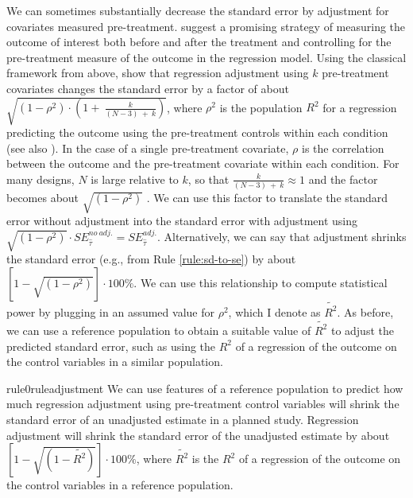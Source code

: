 \documentclass[12pt]{article}
\begin{document}
We can sometimes substantially decrease the standard error by adjustment
for covariates measured pre-treatment. 
\cite{Clifford2021} suggest a promising strategy of measuring the outcome of interest both before and after the treatment and controlling for the pre-treatment measure of the outcome in the regression model. 
Using the classical framework from above, \citet[547]{Cox1982} show that regression adjustment using $k$ pre-treatment covariates changes the standard error by a factor of about $\sqrt{\left( 1 - \rho^{2} \right) \cdot \left( 1 + \ \frac{k}{(N - 3)\  + \ k} \right)}$, where $\rho^{2}$ is the population $R^{2}$ for a regression predicting the outcome using the pre-treatment controls within each condition (see also \citealt{Boldt2024}).
In the case of a single pre-treatment covariate, $\rho$ is the correlation between the outcome and the pre-treatment covariate within each condition. 
For many designs, $N$ is large relative to $k$, so that $\frac{k}{(N - 3)\  + \ k} \approx 1$ and the factor becomes about $\sqrt{\left( 1 - \rho^{2} \right)}$ \citep{Bloom1995, Meyvis2017}. 
We can use this factor to translate the standard error without adjustment into the standard error with adjustment using $\sqrt{\left( 1 - \rho^{2} \right)} \cdot SE_{\widehat{\tau}}^{no\ adj.} = SE_{\widehat{\tau}}^{adj.}$. 
Alternatively, we can say that adjustment shrinks the standard error (e.g., from Rule \ref{rule:sd-to-se}) by about $\left\lbrack 1 - \sqrt{\left( 1 - \rho^{2} \right)} \right\rbrack \cdot 100\%$.
We can use this relationship to compute statistical power by plugging in an assumed value for $\rho^{2}$, which I denote as $\widetilde{R^{2}}$.
As before, we can use a reference population to obtain a suitable value of $\widetilde{R^{2}}$ to adjust the predicted standard error, such as using the $R^{2}$ of a regression of the outcome on the control variables in a similar population.

\begin{restatable}[Adjustment]{rule0}{ruleadjustment}
\label{rule:adjustment}
We can use features of a reference population to predict how much regression adjustment using pre-treatment control variables will shrink the standard error of an unadjusted estimate in a planned study. Regression adjustment will shrink the standard error of the unadjusted estimate by about $\left\lbrack 1 - \sqrt{\left( 1 - \widetilde{R^{2}} \right)} \right\rbrack \cdot 100\%$, where $\widetilde{R^2}$ is the $R^2$ of a regression of the outcome on the control variables in a reference population.
\end{restatable}
\end{document}

